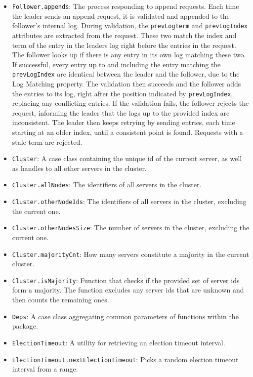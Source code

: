 \begin{itemize}
    \item \lstinline|Follower.appends|: The process responding to append requests. Each time the leader sends an append request, it is validated and appended to the follower's internal log. During validation, the \lstinline|prevLogTerm| and \lstinline|prevLogIndex| attributes are extracted from the request. These two match the index and term of the entry in the leaders log right before the entries in the request. The follower looks up if there is any entry in its own log matching these two. If successful, every entry up to and including the entry matching the \lstinline|prevLogIndex| are identical between the leader and the follower, due to the Log Matching property. The validation then succeeds and the follower adds the entries to its log, right after the position indicated by \lstinline|prevLogIndex|, replacing any conflicting entries. If the validation fails, the follower rejects the request, informing the leader that the logs up to the provided index are inconsistent. The leader then keeps retrying by sending entries, each time starting at an older index, until a consistent point is found. Requests with a stale term are rejected.
    \item \lstinline|Cluster|: A case class containing the unique id of the current server, as well as handles to all other servers in the cluster.
    \item \lstinline|Cluster.allNodes|: The identifiers of all servers in the cluster.
    \item \lstinline|Cluster.otherNodeIds|: The identifiers of all servers in the cluster, excluding the current one.
    \item \lstinline|Cluster.otherNodesSize|: The number of servers in the cluster, excluding the current one.
    \item \lstinline|Cluster.majorityCnt|: How many servers constitute a majority in the current cluster.
    \item \lstinline|Cluster.isMajority|: Function that checks if the provided set of server ids form a majority. The function excludes any server ids that are unknown and then counts the remaining ones.
    \item \lstinline|Deps|: A case class aggregating common parameters of functions within the package.
    \item \lstinline|ElectionTimeout|: A utility for retrieving an election timeout interval.
    \item \lstinline|ElectionTimeout.nextElectionTimeout|: Picks a random election timeout interval from a range.

\end{itemize}
